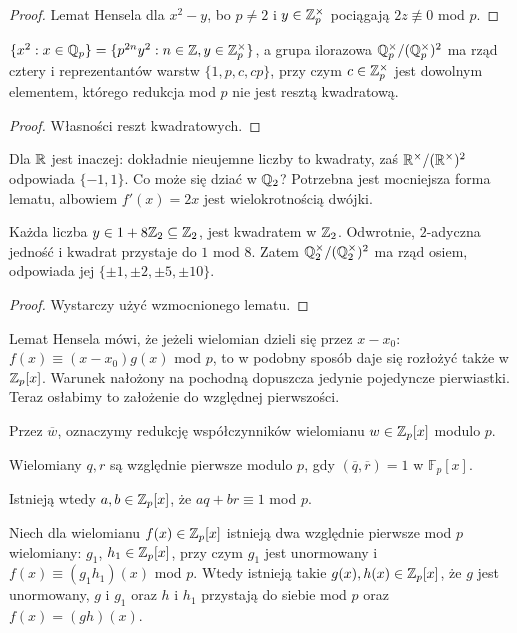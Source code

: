 \begin{proof}
	Lemat Hensela dla $x^2 - y$, bo $p \neq 2$ i $y \in \mathbb Z_p^\times$ pociągają $2 z \not\equiv 0$ mod $p$.
\end{proof}

\begin{wniosek}
	$\{x^2 : x \in \mathbb Q_p\} = \{p^{2n} y^2 : n \in \mathbb Z, y \in \mathbb Z_p^\times\}$, a grupa ilorazowa $\mathbb Q_p^\times / (\mathbb Q_p^\times)^2$ ma rząd cztery i reprezentantów warstw $\{1, p, c, cp\}$, przy czym $c \in \mathbb Z_p^\times$ jest dowolnym elementem, którego redukcja mod $p$ nie jest resztą kwadratową.
\end{wniosek}

\begin{proof}
	Własności reszt kwadratowych.
\end{proof}

Dla $\mathbb R$ jest inaczej: dokładnie nieujemne liczby to kwadraty, zaś $\mathbb R^\times/(\mathbb R^\times)^2$ odpowiada $\{-1, 1\}$. Co może się dziać w $\mathbb Q_2$? Potrzebna jest mocniejsza forma lematu, albowiem $f'(x) = 2x$ jest wielokrotnością dwójki.

\begin{fakt}
	Każda liczba $y \in 1 + 8\mathbb Z_2 \subseteq \mathbb Z_2$, jest kwadratem w $\mathbb Z_2$.
	Odwrotnie, $2$-adyczna jedność i kwadrat przystaje do $1$ mod $8$.
	Zatem $\mathbb Q^\times_2 / (\mathbb Q^\times_2)^2$ ma rząd osiem, odpowiada jej $\{\pm 1, \pm 2, \pm 5, \pm 10\}$.
\end{fakt}

\begin{proof}
	Wystarczy użyć wzmocnionego lematu.
\end{proof}

Lemat Hensela mówi, że jeżeli wielomian dzieli się przez $x - x_0$: $f(x) \equiv (x - x_0) g(x)$ mod $p$, to w podobny sposób daje się rozłożyć także w $\mathbb Z_p[x]$.
Warunek nałożony na pochodną dopuszcza jedynie pojedyncze pierwiastki.
Teraz osłabimy to założenie do względnej pierwszości.

Przez $\overline w$, oznaczymy redukcję współczynników wielomianu $w \in \mathbb Z_p[x]$ modulo $p$.

\begin{definicja}
	Wielomiany $q, r$ są względnie pierwsze modulo $p$, gdy $(\overline q, \overline r) = 1$ w $\mathbb F_p[x]$.
\end{definicja}

Istnieją wtedy $a, b \in \mathbb Z_p[x]$, że $aq + br \equiv 1$ mod $p$.

\begin{twierdzenie}
	Niech dla wielomianu $f(x) \in \mathbb Z_p[x]$ istnieją dwa względnie pierwsze mod $p$ wielomiany: $g_1$, $h_1 \in \mathbb Z_p[x]$, przy czym $g_1$ jest unormowany i $f(x) \equiv (g_1h_1)(x)$ mod $p$.
	Wtedy istnieją takie $g(x), h(x) \in \mathbb Z_p[x]$, że $g$ jest unormowany, $g$ i $g_1$ oraz $h$ i $h_1$ przystają do siebie mod $p$ oraz $f(x) = (gh)(x)$.
\end{twierdzenie}

